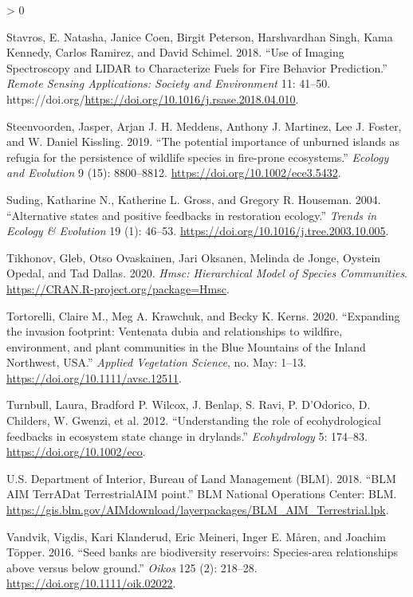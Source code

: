\documentclass[
  12pt,
]{article}
\newlength{\cslhangindent}
\newenvironment{CSLReferences}[2] %
 {%
  \setlength{\parindent}{0pt}
  \ifodd #1 \everypar{\setlength{\hangindent}{\cslhangindent}}\ignorespaces\fi
  \ifnum #2 > 0
  \setlength{\parskip}{#2\baselineskip}
  \fi
 }%
 {}
\begin{document}
\begin{CSLReferences}{1}{0}
\leavevmode\hypertarget{ref-Stavros2018}{}%
Stavros, E. Natasha, Janice Coen, Birgit Peterson, Harshvardhan Singh,
Kama Kennedy, Carlos Ramirez, and David Schimel. 2018. {``Use of Imaging
Spectroscopy and {LIDAR} to Characterize Fuels for Fire Behavior
Prediction.''} \emph{Remote Sensing Applications: Society and
Environment} 11: 41--50.
https://doi.org/\url{https://doi.org/10.1016/j.rsase.2018.04.010}.

\leavevmode\hypertarget{ref-Steenvoorden2019}{}%
Steenvoorden, Jasper, Arjan J. H. Meddens, Anthony J. Martinez, Lee J.
Foster, and W. Daniel Kissling. 2019. {``{The potential importance of
unburned islands as refugia for the persistence of wildlife species in
fire-prone ecosystems}.''} \emph{Ecology and Evolution} 9 (15):
8800--8812. \url{https://doi.org/10.1002/ece3.5432}.

\leavevmode\hypertarget{ref-Suding2004}{}%
Suding, Katharine N., Katherine L. Gross, and Gregory R. Houseman. 2004.
{``{Alternative states and positive feedbacks in restoration
ecology}.''} \emph{Trends in Ecology \& Evolution} 19 (1): 46--53.
\url{https://doi.org/10.1016/j.tree.2003.10.005}.

\leavevmode\hypertarget{ref-HMSC}{}%
Tikhonov, Gleb, Otso Ovaskainen, Jari Oksanen, Melinda de Jonge, Oystein
Opedal, and Tad Dallas. 2020. \emph{Hmsc: Hierarchical Model of Species
Communities}. \url{https://CRAN.R-project.org/package=Hmsc}.

\leavevmode\hypertarget{ref-Tortorelli2020}{}%
Tortorelli, Claire M., Meg A. Krawchuk, and Becky K. Kerns. 2020.
{``{Expanding the invasion footprint: Ventenata dubia and relationships
to wildfire, environment, and plant communities in the Blue Mountains of
the Inland Northwest, USA}.''} \emph{Applied Vegetation Science}, no.
May: 1--13. \url{https://doi.org/10.1111/avsc.12511}.

\leavevmode\hypertarget{ref-Turnbull2012}{}%
Turnbull, Laura, Bradford P. Wilcox, J. Benlap, S. Ravi, P. D'Odorico,
D. Childers, W. Gwenzi, et al. 2012. {``{Understanding the role of
ecohydrological feedbacks in ecosystem state change in drylands}.''}
\emph{Ecohydrology} 5: 174--83. \url{https://doi.org/10.1002/eco}.

\leavevmode\hypertarget{ref-AIM}{}%
U.S. Department of Interior, Bureau of Land Management (BLM). 2018.
{``{BLM AIM TerrADat TerrestrialAIM point}.''} BLM National Operations
Center: BLM.
\url{https://gis.blm.gov/AIMdownload/layerpackages/BLM_AIM_Terrestrial.lpk}.

\leavevmode\hypertarget{ref-Vandvik2016}{}%
Vandvik, Vigdis, Kari Klanderud, Eric Meineri, Inger E. Måren, and
Joachim Töpper. 2016. {``{Seed banks are biodiversity reservoirs:
Species-area relationships above versus below ground}.''} \emph{Oikos}
125 (2): 218--28. \url{https://doi.org/10.1111/oik.02022}.


\end{CSLReferences}
\end{document}
